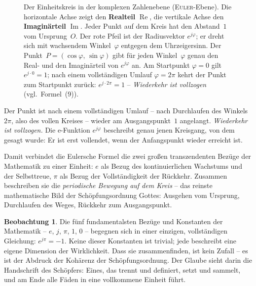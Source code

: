 ﻿\documentclass[a4paper,12pt]{article}
\theoremstyle{definition}
\newtheorem{observation}{Beobachtung}[section]
\begin{document}
\begin{figure}[ht]
\begin{tikzpicture}[scale=2.8, >=Stealth]
\end{tikzpicture}
\caption{%
  Der Einheitskreis in der komplexen Zahlenebene (\textsc{Euler}-Ebene).
  Die horizontale Achse zeigt den \textbf{Realteil} $\operatorname{Re}$,
  die vertikale Achse den \textbf{Imaginärteil} $\operatorname{Im}$.
  Jeder Punkt auf dem Kreis hat den Abstand~$1$ vom Ursprung~$O$.
  Der rote Pfeil ist der Radiusvektor $e^{j\varphi}$; er dreht sich
  mit wachsendem Winkel~$\varphi$ entgegen dem Uhrzeigersinn.
  Der Punkt~$P = (\cos\varphi,\, \sin\varphi)$ gibt für jeden Winkel~$\varphi$
  genau den Real- und den Imaginärteil von $e^{j\varphi}$ an.
  Am Startpunkt $\varphi = 0$ gilt $e^{j\cdot 0} = 1$;
  nach einem vollständigen Umlauf $\varphi = 2\pi$ kehrt der Punkt
  zum Startpunkt zurück: $e^{j\cdot 2\pi} = 1$
  -- \textit{Wiederkehr ist vollzogen} (vgl.~Formel~(9)).
}
\label{fig:einheitskreis}
\end{figure}

Der Punkt ist nach einem vollständigen Umlauf -- nach Durchlaufen des Winkels
$2\pi$, also des vollen Kreises -- wieder am Ausgangspunkt~$1$ angelangt.
\textit{Wiederkehr ist vollzogen.} Die e-Funktion $e^{j\varphi}$
beschreibt genau jenen Kreisgang, von dem gesagt wurde: Er ist erst vollendet,
wenn der Anfangspunkt wieder erreicht ist.

Damit verbindet die Eulersche Formel die zwei großen transzendenten Bezüge der
Mathematik zu einer Einheit: $e$ als Bezug des kontinuierlichen Wachstums und
der Selbsttreue, $\pi$ als Bezug der Vollständigkeit der Rückkehr. Zusammen
beschreiben sie die \textit{periodische Bewegung auf dem Kreis} -- das reinste
mathematische Bild der Schöpfungsordnung Gottes: Ausgehen vom Ursprung,
Durchlaufen des Weges, Rückkehr zum Ausgangspunkt.

\begin{observation}
	Die fünf fundamentalsten Bezüge und Konstanten der Mathematik -- $e$, $j$, $\pi$, $1$,
	$0$ -- begegnen sich in einer einzigen, vollständigen Gleichung: $e^{j\pi} = -1$. Keine dieser Konstanten ist trivial; jede beschreibt eine eigene
	Dimension der Wirklichkeit. Dass sie zusammenfinden, ist kein Zufall -- es
	ist der Abdruck der Kohärenz der Schöpfungsordnung. Der Glaube sieht darin
	die Handschrift des Schöpfers: Eines, das trennt und definiert, setzt und
	sammelt, und am Ende alle Fäden in eine vollkommene Einheit führt.
\end{observation}
\end{document}
